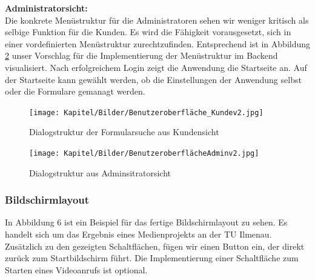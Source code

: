 \noindent \textbf{Administratorsicht:} \\

\noindent Die konkrete Menüstruktur für die Administratoren sehen wir weniger kritisch als selbige Funktion für die Kunden. Es wird die Fähigkeit vorausgesetzt, sich in einer vordefinierten Menüstruktur zurechtzufinden. Entsprechend ist in Abbildung \ref{fig:DiaglogAdmin} unser Vorschlag für die Implementierung der Menüstruktur im Backend visualisiert. Nach erfolgreichem Login zeigt die Anwendung die Startseite an. Auf der Startseite kann gewählt werden, ob die Einstellungen der Anwendung selbst oder die Formulare gemanagt werden.

\newpage

\thispagestyle{empty}
\begin{landscape}
  \begin{figure}
      \centering
      \texttt{[image: Kapitel/Bilder/Benutzeroberfläche\_Kundev2.jpg]}
      \caption{Dialogstruktur der Formularsuche aus Kundensicht}
      \label{fig:DiaglogKunden}
  \end{figure}
\end{landscape}

\newpage
\thispagestyle{empty}
\begin{landscape}
  \begin{figure}
      \centering
      \texttt{[image: Kapitel/Bilder/BenutzeroberflächeAdminv2.jpg]}
      \caption{Dialogstruktur aus Adminsitratorsicht}
      \label{fig:DiaglogAdmin}
  \end{figure}
\end{landscape}
\newpage

\subsubsection{Bildschirmlayout}

In Abbildung 6 ist ein Beispiel für das fertige Bildschirmlayout zu sehen. Es handelt sich um das Ergebnis eines Medienprojekts an der TU Ilmenau. Zusätzlich zu den gezeigten Schaltflächen, fügen wir einen Button ein, der direkt zurück zum Startbildschirm führt. Die Implementierung einer Schaltfläche zum Starten eines Videoanrufs ist optional.

